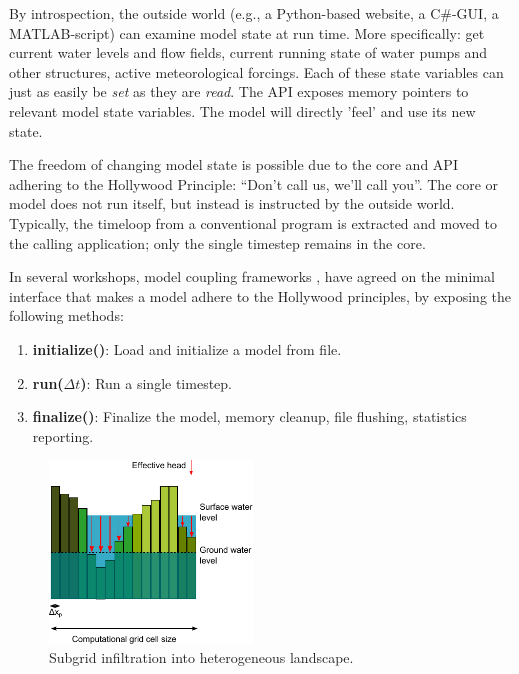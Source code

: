 \documentclass[a4paper]{article}
\begin{document}
By introspection, the outside world (e.g., a Python-based website, a C\#-\ac{GUI}, a MATLAB-script) can examine model state at run time. More specifically: get current water levels and flow fields, current running state of water pumps and other structures, active meteorological forcings. Each of these state variables can just as easily be \emph{set} as they are \emph{read}. The \ac{API} exposes memory pointers to relevant model state variables. The model will directly 'feel' and use its new state.

The freedom of changing model state is possible due to the core and \ac{API} adhering to the Hollywood Principle: ``Don't call us, we'll call you''. The core or model does not run itself, but instead is instructed by the outside world. Typically, the timeloop from a conventional program is extracted and moved to the calling application; only the single timestep remains in the core.

In several workshops, model coupling frameworks \citep[see][for an overview]{Jagers2010}, have agreed on the minimal interface that makes a model adhere to the Hollywood principles, by exposing the following methods:

\begin{enumerate}
\item \textbf{initialize()}: Load and initialize a model from file.
\item \textbf{run($\Delta t$)}: Run a single timestep.
\item \textbf{finalize()}: Finalize the model, memory cleanup, file flushing, statistics reporting.
\end{enumerate}

\begin{figure}
\centering
\includegraphics[width=0.48\textwidth]{subgrid_hydrology}
\caption{Subgrid infiltration into heterogeneous landscape.}
\label{fig:figure2}
\end{figure}
\end{document}
